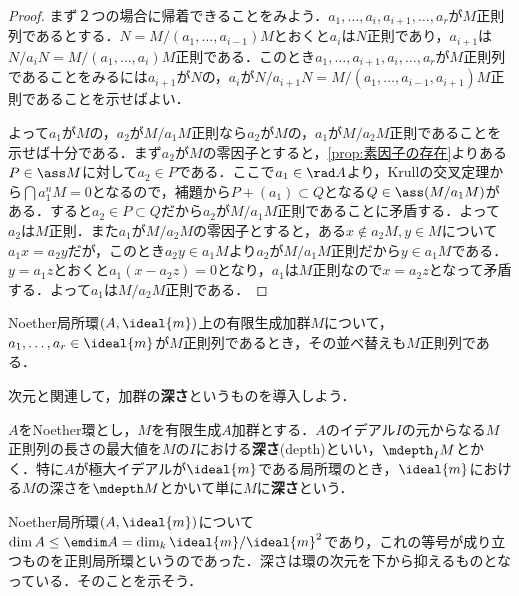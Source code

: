 \begin{proof}
	まず２つの場合に帰着できることをみよう．$a_1,\dots,a_i,a_{i+1},\dots,a_r$が$M$正則列であるとする．$N=M/(a_1,\dots,a_{i-1})M$とおくと$a_i$は$N$正則であり，$a_{i+1}$は$N/a_iN=M/(a_1,\dots,a_i)M$正則である．このとき$a_1,\dots,a_{i+1},a_i,\dots,a_r$が$M$正則列であることをみるには$a_{i+1}$が$N$の，$a_i$が$N/a_{i+1}N=M/(a_1,\dots,a_{i-1},a_{i+1})M$正則であることを示せばよい．
	
	よって$a_1$が$M$の，$a_2$が$M/a_1M$正則なら$a_2$が$M$の，$a_1$が$M/a_2M$正則であることを示せば十分である．まず$a_2$が$M$の零因子とすると，\ref{prop:素因子の存在}よりある$P\in\ass M$に対して$a_2\in P$である．ここで$a_1\in\rad A$より，Krullの交叉定理から$\bigcap a_1^nM=0$となるので，補題から$P+(a_1)\subset Q$となる$Q\in\ass (M/a_1M)$がある．すると$a_2\in P\subset Q$だから$a_2$が$M/a_1M$正則であることに矛盾する．よって$a_2$は$M$正則．また$a_1$が$M/a_2M$の零因子とすると，ある$x\not\in a_2M,y\in M$について$a_1x=a_2y$だが，このとき$a_2y\in a_1M$より$a_2$が$M/a_1M$正則だから$y\in a_1M$である．$y=a_1z$とおくと$a_1(x-a_2z)=0$となり，$a_1$は$M$正則なので$x=a_2z$となって矛盾する．よって$a_1$は$M/a_2M$正則である．
\end{proof}

\begin{cor}
	Noether局所環$(A,\ideal{m})$上の有限生成加群$M$について，$a_1,\dots,a_r\in\ideal{m}$が$M$正則列であるとき，その並べ替えも$M$正則列である．
\end{cor}

次元と関連して，加群の\textbf{深さ}というものを導入しよう．

\begin{defi}[深さ]
	$A$をNoether環とし，$M$を有限生成$A$加群とする．$A$のイデアル$I$の元からなる$M$正則列の長さの最大値を$M$の$I$における\textbf{深さ}(depth)といい，$\mdepth_I M$とかく．特に$A$が極大イデアルが$\ideal{m}$である局所環のとき，$\ideal{m}$における$M$の深さを$\mdepth M$とかいて単に$M$に\textbf{深さ}という．
\end{defi}

Noether局所環$(A,\ideal{m})$について$\dim A\leq \emdim A=\dim_k\ideal{m}/\ideal{m}^2$であり，これの等号が成り立つものを正則局所環というのであった．深さは環の次元を下から抑えるものとなっている．そのことを示そう．

